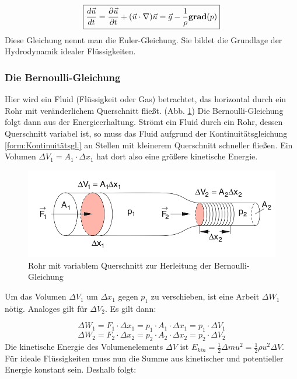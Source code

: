 \begin{equation}
\boxed{\frac{d \vec{u}}{dt} = \frac{\partial \vec{u}}{\partial t} + (\vec{u} \cdot \nabla) \vec{u} = \vec{g} - \frac{1}{\rho} {\bf grad} (p)}
\end{equation}
Diese Gleichung nennt man die Euler-Gleichung. Sie bildet die Grundlage der Hydrodynamik idealer Flüssigkeiten.

\subsubsection{Die Bernoulli-Gleichung}
Hier wird ein Fluid (Flüssigkeit oder Gas) betrachtet, das horizontal durch ein Rohr mit veränderlichem Querschnitt fließt. (Abb. \ref{fig:8-8}) Die Bernoulli-Gleichung folgt dann aus der Energieerhaltung. Strömt ein Fluid durch ein Rohr, dessen Querschnitt variabel ist, so muss das Fluid aufgrund der Kontinuitätsgleichung \ref{form:Kontinuitätsgl.} an Stellen mit kleinerem Querschnitt schneller fließen. Ein Volumen $ \Delta V_1 = A_1 \cdot \Delta x_1 $ hat dort also eine größere kinetische Energie.

\begin{figure}
		\centering
        \includegraphics[width=.9\textwidth]{images/8-8}
\caption{ Rohr mit variablem Querschnitt zur Herleitung der Bernoulli-Gleichung }
\label{fig:8-8}
\end{figure}

Um das Volumen $ \Delta V_1 $ um $ \Delta x_1 $ gegen $ p_1 $ zu verschieben, ist eine Arbeit $ \Delta W_1 $ nötig. Analoges gilt für $ \Delta V_2 $. Es gilt dann:

\begin{equation}
\Delta W_1 = F_1 \cdot \Delta x_1 = p_1 \cdot A_1 \cdot \Delta x_1 = p_1 \cdot \Delta V_1
\end{equation}
\begin{equation}
\Delta W_2 = F_2 \cdot \Delta x_2 = p_2 \cdot A_2 \cdot \Delta x_2 = p_2 \cdot \Delta V_2
\end{equation}
Die kinetische Energie des Volumenelements $ \Delta V $ ist $ E_{kin} = \frac{1}{2} \Delta m u^2 = \frac{1}{2} \rho u^2 \Delta V $. Für ideale Flüssigkeiten muss nun die Summe aus kinetischer und potentieller Energie konstant sein. Deshalb folgt:

